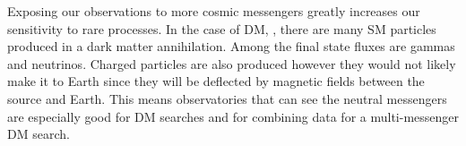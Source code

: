 \begin{figure}[h]
\end{figure}

Exposing our observations to more cosmic messengers greatly increases our sensitivity to rare processes.
In the case of DM, ,  there are many SM particles produced in a dark matter annihilation.
Among the final state fluxes are gammas and neutrinos.
Charged particles are also produced however they would not likely make it to Earth since they will be deflected by magnetic fields between the source and Earth.
This means observatories that can see the neutral messengers are especially good for DM searches and for combining data for a multi-messenger DM search.
